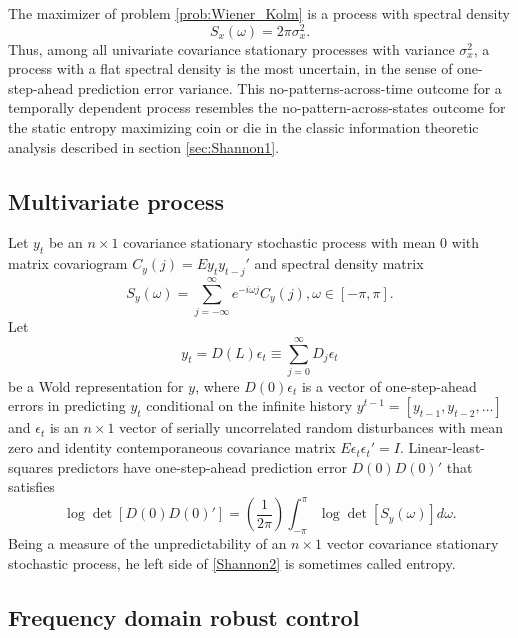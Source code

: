 \begin{subappendices}
\noindent The maximizer of  problem \ref{prob:Wiener_Kolm} is  a process with spectral density
\[ S_x(\omega) = 2 \pi \sigma_x^2.\]
Thus,  among
all univariate covariance stationary processes with variance $\sigma_x^2$, a process with a flat spectral density is the most uncertain, in the sense of one-step-ahead prediction error variance.  This no-patterns-across-time outcome for a temporally dependent process resembles the no-pattern-across-states outcome for the static entropy maximizing coin or die  in the classic information theoretic
analysis described in section \ref{sec:Shannon1}.

\subsection{Multivariate process}

Let $y_t$ be an $n \times 1$ covariance stationary stochastic process with mean $0$ with
matrix covariogram $C_y(j) = E y_t y_{t-j}' $ and spectral density matrix
\[ S_y(\omega) = \sum_{j=-\infty}^\infty e^{- i \omega j} C_y(j), \omega \in [-\pi, \pi].  \]
Let
\[ y_t = D(L) \epsilon_t  \equiv \sum_{j=0}^\infty D_j \epsilon_t \]
be a Wold representation for $y$, where $D(0)\epsilon_t$ is a
vector of one-step-ahead errors in predicting $y_t$ conditional on the infinite history $y^{t-1} = [y_{t-1}, y_{t-2}, \ldots ]$ and
$\epsilon_t$ is an $n\times 1$ vector of serially uncorrelated random disturbances with mean zero and identity contemporaneous
covariance matrix $E \epsilon_t \epsilon_t' = I$.
 Linear-least-squares predictors have one-step-ahead prediction error $D(0)  D(0)'$
  that satisfies
\begin{equation}\label{Shannon2}
\log \det [D(0) D(0)'] = \left(\frac{1}{2 \pi} \right) \int_{-\pi}^\pi \log \det [S_y(\omega)] d \omega.
\end{equation}
Being a  measure of the unpredictability of an $n \times 1$ vector covariance stationary  stochastic process,
 he left side of  \eqref{Shannon2} is sometimes called entropy.
\subsection{Frequency domain robust control}


\end{subappendices}
